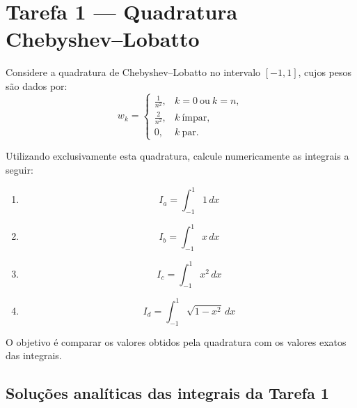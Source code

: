 \documentclass[12pt,a4paper]{article}
\begin{document}


\section{Tarefa 1 — Quadratura Chebyshev–Lobatto}

Considere a quadratura de Chebyshev–Lobatto no intervalo $[-1,1]$, cujos pesos são dados por:
\[
w_k = 
\begin{cases}
\frac{1}{n^2}, & k = 0 \ \text{ou}\ k = n, \\[6pt]
\frac{2}{n^2}, & k \ \text{ímpar}, \\[6pt]
0, & k \ \text{par}.
\end{cases}
\]

Utilizando exclusivamente esta quadratura, calcule numericamente as integrais a seguir:

\begin{enumerate}
    \item 
    \[
    I_a = \int_{-1}^{1} 1 \, dx
    \]

    \item 
    \[
    I_b = \int_{-1}^{1} x \, dx
    \]

    \item 
    \[
    I_c = \int_{-1}^{1} x^2 \, dx
    \]

    \item 
    \[
    I_d = \int_{-1}^{1} \sqrt{1 - x^2} \, dx
    \]
\end{enumerate}

O objetivo é comparar os valores obtidos pela quadratura com os valores exatos das integrais.

\subsection{Soluções analíticas das integrais da Tarefa 1}
\end{document}
